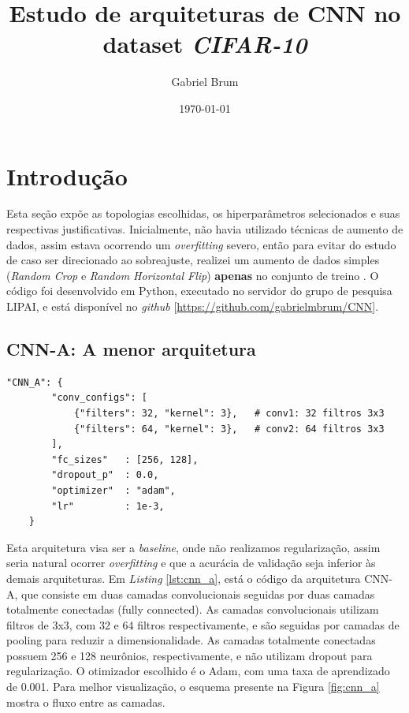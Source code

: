 \documentclass[a4paper,12pt]{article}
\title{\textbf{Estudo de arquiteturas de CNN no dataset \textit{CIFAR-10}}}
\author{Gabriel Brum}
\date{\today}
\begin{document}
\maketitle
\tableofcontents
\newpage

\section{Introdução}

Esta seção expõe as topologias escolhidas, os hiperparâmetros selecionados e suas respectivas justificativas. Inicialmente, não havia utilizado técnicas de aumento de dados, assim estava ocorrendo um \textit{overfitting} severo, então para evitar do estudo de caso ser direcionado ao sobreajuste, realizei um aumento de dados simples (\textit{Random Crop} e \textit{Random Horizontal Flip}) \textbf{apenas} no conjunto de treino . O código foi desenvolvido em Python, executado no servidor do grupo de pesquisa LIPAI, e está disponível no \textit{github} [\url{https://github.com/gabrielmbrum/CNN}].
 



\subsection{CNN-A: A menor arquitetura}

\begin{lstlisting}[style=python, caption={Arquitetura A (CNN simples).}, label={lst:cnn_a}]
"CNN_A": {
        "conv_configs": [
            {"filters": 32, "kernel": 3},   # conv1: 32 filtros 3x3
            {"filters": 64, "kernel": 3},   # conv2: 64 filtros 3x3
        ],
        "fc_sizes"   : [256, 128],
        "dropout_p"  : 0.0,
        "optimizer"  : "adam",
        "lr"         : 1e-3,
    }
\end{lstlisting}

Esta arquitetura visa ser a \textit{baseline}, onde não realizamos regularização, assim seria natural ocorrer \textit{overfitting} e que a acurácia de validação seja inferior às demais arquiteturas.
Em \textit{Listing} \ref{lst:cnn_a}, está o código da arquitetura CNN-A, que consiste em duas camadas convolucionais seguidas por duas camadas totalmente conectadas (fully connected). As camadas convolucionais utilizam filtros de 3x3, com 32 e 64 filtros respectivamente, e são seguidas por camadas de pooling para reduzir a dimensionalidade. As camadas totalmente conectadas possuem 256 e 128 neurônios, respectivamente, e não utilizam dropout para regularização. O otimizador escolhido é o Adam, com uma taxa de aprendizado de 0.001.
Para melhor visualização, o esquema presente na Figura \ref{fig:cnn_a} mostra o fluxo entre as camadas.
\end{document}
